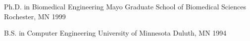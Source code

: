 

\begin{cventries}

  \cventry
    {Ph.D. in Biomedical Engineering} %
    {Mayo Graduate School of Biomedical Sciences} %
    {Rochester, MN} %
    {1999} %
    {
    }

  \cventry
    {B.S. in Computer Engineering} %
    {University of Minnesota} %
    {Duluth, MN} %
    {1994} %
    {
    }
\end{cventries}

